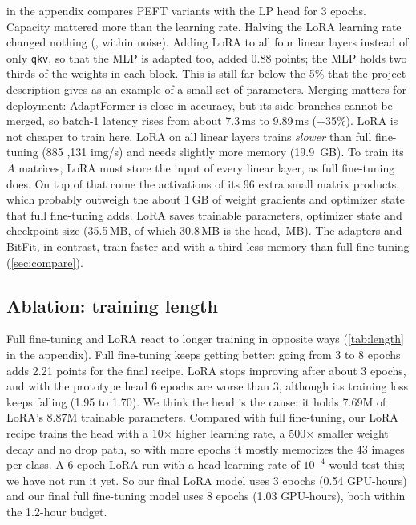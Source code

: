  in the appendix compares PEFT variants with the LP head for 3 epochs.
Capacity mattered more than the learning rate.
Halving the LoRA learning rate changed nothing (, within noise).
Adding LoRA to all four linear layers instead of only \texttt{qkv}, so that the MLP is adapted too, added 0.88 points; the MLP holds two thirds of the weights in each block.
This is still far below the 5\% that the project description gives as an example of a small set of parameters.
Merging matters for deployment: AdaptFormer is close in accuracy, but its side branches cannot be merged, so batch-1 latency rises from about 7.3\,ms to 9.89\,ms ($+$35\%).
LoRA is not cheaper to train here.
LoRA on all linear layers trains \emph{slower} than full fine-tuning (885 ,131 img/s) and needs slightly more memory (19.9 \,GB).
To train its $A$ matrices, LoRA must store the input of every linear layer, as full fine-tuning does.
On top of that come the activations of its 96 extra small matrix products, which probably outweigh the about 1\,GB of weight gradients and optimizer state that full fine-tuning adds.
LoRA saves trainable parameters, optimizer state and checkpoint size (35.5\,MB, of which 30.8\,MB is the head, \,MB).
The adapters and BitFit, in contrast, train faster and with a third less memory than full fine-tuning (\cref{sec:compare}).

\subsection{Ablation: training length}
\label{sec:ablation-length}

Full fine-tuning and LoRA react to longer training in opposite ways (\cref{tab:length} in the appendix).
Full fine-tuning keeps getting better: going from 3 to 8 epochs adds 2.21 points for the final recipe.
LoRA stops improving after about 3 epochs, and with the prototype head 6 epochs are worse than 3, although its training loss keeps falling (1.95 to 1.70).
We think the head is the cause: it holds 7.69M of LoRA's 8.87M trainable parameters.
Compared with full fine-tuning, our LoRA recipe trains the head with a 10$\times$ higher learning rate, a 500$\times$ smaller weight decay and no drop path, so with more epochs it mostly memorizes the 43 images per class.
A 6-epoch LoRA run with a head learning rate of $10^{-4}$ would test this; we have not run it yet.
So our final LoRA model uses 3 epochs (0.54 GPU-hours) and our final full fine-tuning model uses 8 epochs (1.03 GPU-hours), both within the 1.2-hour budget.

